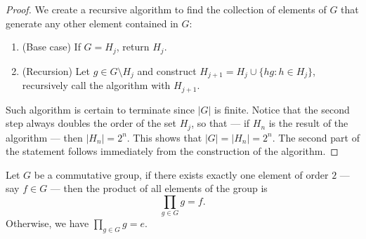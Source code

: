 \begin{proof}
  We create a recursive algorithm to find the collection of elements of \(G\)
  that generate any other element contained in \(G\):
  \begin{enumerate}
    \item (Base case) If \(G = H_j\), return \(H_j\).
    \item (Recursion) Let \(g \in G \setminus H_j\) and construct \(H_{j + 1} =
      H_j \cup \{h g: h \in H_j\}\), recursively call the algorithm with \(H_{j
      + 1}\).
  \end{enumerate}
  Such algorithm is certain to terminate since \(|G|\) is finite. Notice that
  the second step always doubles the order of the set \(H_j\), so that --- if
  \(H_n\) is the result of the algorithm --- then \(|H_n| = 2^n\). This shows
  that \(|G| = |H_n| = 2^n\). The second part of the statement follows
  immediately from the construction of the algorithm.
\end{proof}

\begin{proposition}
  Let \(G\) be a commutative group, if there exists exactly one element of order
  \(2\) --- say \(f \in G\) --- then the product of all elements of the group is
  \[
    \prod_{g \in G} g = f.
  \]
  Otherwise, we have \(\prod_{g \in G} g = e\).
\end{proposition}

